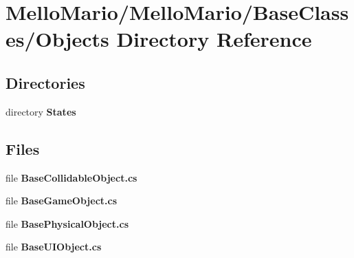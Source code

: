 \section{Mello\+Mario/\+Mello\+Mario/\+Base\+Classes/\+Objects Directory Reference}
\label{dir_7a2892ba01e2d2626355c7fecb8fa6a3}
\subsection*{Directories}
\begin{DoxyCompactItemize}
\item 
directory \textbf{ States}
\end{DoxyCompactItemize}
\subsection*{Files}
\begin{DoxyCompactItemize}
\item 
file \textbf{ Base\+Collidable\+Object.\+cs}
\item 
file \textbf{ Base\+Game\+Object.\+cs}
\item 
file \textbf{ Base\+Physical\+Object.\+cs}
\item 
file \textbf{ Base\+U\+I\+Object.\+cs}
\end{DoxyCompactItemize}
